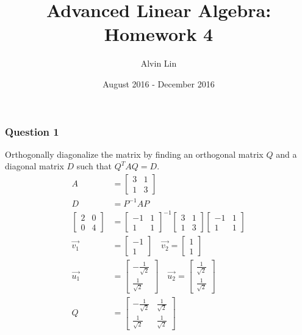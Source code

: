\documentclass{math}
\title{Advanced Linear Algebra: Homework 4}
\author{Alvin Lin}
\date{August 2016 - December 2016}
\begin{document}
\maketitle

\subsubsection*{Question 1}
Orthogonally diagonalize the matrix by finding an orthogonal matrix \( Q \)
and a diagonal matrix \( D \) such that \( Q^TAQ = D \).
\begin{align*}
  A &= \begin{bmatrix}3 & 1 \\ 1 & 3\end{bmatrix} \\
  D &= P^{-1}AP \\
  \begin{bmatrix}2 & 0 \\ 0 & 4\end{bmatrix} &=
    \begin{bmatrix}-1 & 1 \\ 1 & 1\end{bmatrix}^{-1}
    \begin{bmatrix}3 & 1 \\ 1 & 3\end{bmatrix}
    \begin{bmatrix}-1 & 1 \\ 1 & 1\end{bmatrix} \\
  \vec{v_1} &= \begin{bmatrix}-1 \\ 1\end{bmatrix} \quad
    \vec{v_2} = \begin{bmatrix}1 \\ 1\end{bmatrix} \\
  \vec{u_1} &= \begin{bmatrix}
    -\frac{1}{\sqrt{2}} \\ \frac{1}{\sqrt{2}}
  \end{bmatrix} \quad \vec{u_2} = \begin{bmatrix}
    \frac{1}{\sqrt{2}} \\ \frac{1}{\sqrt{2}}
  \end{bmatrix} \\
  Q &= \begin{bmatrix}
    -\frac{1}{\sqrt{2}} & \frac{1}{\sqrt{2}} \\
    \frac{1}{\sqrt{2}} & \frac{1}{\sqrt{2}}
  \end{bmatrix}
\end{align*}
\end{document}
